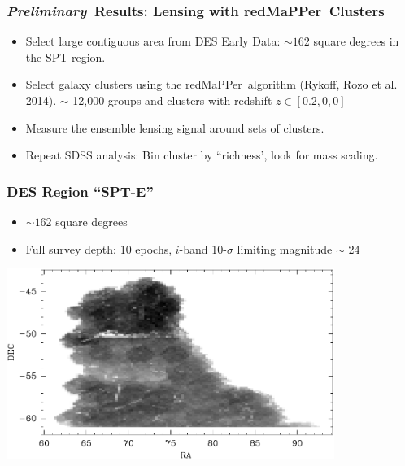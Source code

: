 \documentclass{beamer}
\newcommand{\redmapper}{redMaPPer}
\newcommand{\prelim}{{\bf{\it Preliminary}}}
\begin{document}
\frame
{
    \frametitle{\prelim\ Results: Lensing with \redmapper\ Clusters}
    
    \begin{itemize}

        \item Select large contiguous area from DES Early Data: $\sim 162$ square degrees
            in the SPT region.

        \item Select galaxy clusters using the \redmapper\ algorithm (Rykoff,
            Rozo et al. 2014).  $\sim$ 12,000 groups and clusters with redshift
            $z \in [0.2,0,0]$

        \item Measure the ensemble lensing signal around sets of clusters.

        \item Repeat SDSS analysis: Bin cluster by ``richness', look for mass scaling.

    \end{itemize}
}

\frame
{
    \frametitle{DES Region ``SPT-E''}

    \begin{itemize}

        \item $\sim 162$ square degrees

        \item Full survey depth: 10 epochs, $i$-band 10-$\sigma$ limiting magnitude
            $\sim$ 24

    \end{itemize}

    \begin{center}
        \includegraphics[width=0.8\textwidth]{spte-greyscale-density-010000000.pdf}
    \end{center}

}
\end{document}

